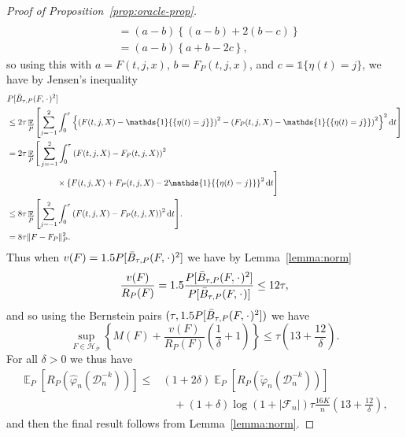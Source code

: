 \documentclass[a4paper,danish]{article}
\theoremstyle{plain} %
\numberwithin{theorem}{section}
\theoremstyle{definition} %
\theoremstyle{remark}
\DeclareMathOperator{\E}{\mathbb{E}} %
\newcommand{\blank}{\makebox[1ex]{\textbf{$\cdot$}}}
\renewcommand{\phi}{\varphi}
\newcommand*\diff{\mathop{}\!\mathrm{d}}
\newcommand{\1}{\mathds{1}}
\newcommand{\data}{\ensuremath{\mathcal{D}}}
\begin{document}
\begin{proof}[Proof of Proposition~\ref{prop:oracle-prop}]
\begin{align*}
  \\
  & = (a-b)
    \left\{
    (a-b) +  2(b-c)
    \right\}
  \\
  & = (a-b)
    \left\{
     a + b -2c
    \right\},
\end{align*}
so using this with \( a=F(t, j, x) \), \( b=F_P(t, j, x) \), and
\( c = \1{\{\eta(t) = j\}} \), we have by Jensen's inequality
\begin{align*}
  & P{[\bar{B}_{\tau,P}(F, \blank)^2]}
  \\
  & \leq
    2\tau\E_{P}{\left[
    \sum_{j=-1}^{2} \int_0^{\tau}
    \left\{
    \left(
    F(t, j, X) - \1{\{\eta(t) = j\}}
    \right)^2
    -
    \left(
    F_P(t, j, X) - \1{\{\eta(t) = j\}}
    \right)^2
    \right\}^2
    \diff t 
    \right]}
  \\
  & =2\tau
    \E_{P}\Bigg[
    \sum_{j=-1}^{2} \int_0^{\tau}
    \left(
    F(t, j, X) - F_P(t, j, X)
    \right)^2
  \\
  & \quad \quad \quad\quad \quad \quad \times
    \left\{
    F(t, j, X) +  F_P(t, j, X)-2 \1{\{\eta(t) = j\}}
    \right\}^2
    \diff t 
    \Bigg]
  \\
  & \leq
    8\tau \E_{P}{\left[
    \sum_{j=-1}^{2} \int_0^{\tau}
    \left(
    F(t, j, X) - F_P(t, j, X)
    \right)^2
    \diff t 
    \right]}.
  \\
  & =
    8\tau \Vert F - F_P \Vert_{P}^2.
\end{align*}
Thus when \( v(F) = 1.5 P{[\bar{B}_{\tau,P}(F, \blank)^2]} \) we have by
Lemma~\ref{lemma:norm}
\begin{equation*}
  \frac{v(F)}{R_P(F)}
  = 1.5 \frac{P{[\bar{B}_{\tau,P}(F, \blank)^2]}}{P{[\bar{B}_{\tau,P}(F, \blank)]}}
  \leq 12 \tau,
\end{equation*}
and so using the Bernstein pairs \( (\tau, 1.5 P{[\bar{B}_{\tau,P}(F, \blank)^2]}) \) we have
\begin{equation*}
  \sup_{F \in \mathcal{H}_{\mathcal{P}}}
  \left\{
    M(F) + \frac{v(F)}{R_P(F)}
    \left(
      \frac{1}{\delta} + 1
    \right)
  \right\}
  \leq \tau
  \left(
    13 + \frac{12}{\delta}
  \right).
\end{equation*}
For all $\delta>0$ we thus have
\begin{align*}
  \E_{P}{\left[ R_P(\hat{\phi}_n(\data_n^{-k})) \right]}
  \leq
  &(1+2\delta)\E_{P}{\left[ R_P(\tilde{\phi}_n(\data_n^{-k})) \right]}
  \\
  & \quad
    + (1+\delta)\log(1 + |\mathcal{F}_n|) \tau \frac{16 K}{n}
    \left(
    13 + \frac{12}{\delta}
    \right),
\end{align*}
and then the final result follows from Lemma~\ref{lemma:norm}.
\end{proof}
\end{document}
